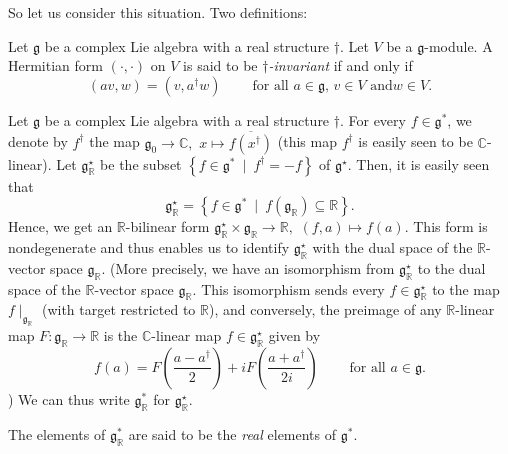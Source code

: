 \documentclass[etingof-lie.tex]{subfiles}
\begin{document}
So let us consider this situation. Two definitions:

\begin{definition}
Let $\mathfrak{g}$ be a complex Lie algebra with a real structure $\dag$. Let
$V$ be a $\mathfrak{g}$-module. A Hermitian form $\left(  \cdot,\cdot\right)
$ on $V$ is said to be $\dag$\textit{-invariant} if and only if%
\[
\left(  av,w\right)  =\left(  v,a^{\dag}w\right)
\ \ \ \ \ \ \ \ \ \ \text{for all }a\in\mathfrak{g}\text{, }v\in V\text{ and
}w\in V.
\]

\end{definition}

\begin{definition}
\label{def.gRstar}Let $\mathfrak{g}$ be a complex Lie algebra with a real
structure $\dag$. For every $f\in\mathfrak{g}^{\ast}$, we denote by $f^{\dag}$
the map $\mathfrak{g}_{0}\rightarrow\mathbb{C},$ $x\mapsto\overline{f\left(
x^{\dag}\right)  }$ (this map $f^{\dag}$ is easily seen to be $\mathbb{C}%
$-linear). Let $\mathfrak{g}_{\mathbb{R}}^{\star}$ be the subset $\left\{
f\in\mathfrak{g}^{\ast}\ \mid\ f^{\dag}=-f\right\}  $ of $\mathfrak{g}^{\star
}$. Then, it is easily seen that%
\[
\mathfrak{g}_{\mathbb{R}}^{\star}=\left\{  f\in\mathfrak{g}^{\ast}%
\ \mid\ f\left(  \mathfrak{g}_{\mathbb{R}}\right)  \subseteq\mathbb{R}%
\right\}  .
\]
Hence, we get an $\mathbb{R}$-bilinear form $\mathfrak{g}_{\mathbb{R}}^{\star
}\times\mathfrak{g}_{\mathbb{R}}\rightarrow\mathbb{R},$ $\left(  f,a\right)
\mapsto f\left(  a\right)  $. This form is nondegenerate and thus enables us
to identify $\mathfrak{g}_{\mathbb{R}}^{\star}$ with the dual space of the
$\mathbb{R}$-vector space $\mathfrak{g}_{\mathbb{R}}$. (More precisely, we
have an isomorphism from $\mathfrak{g}_{\mathbb{R}}^{\star}$ to the dual space
of the $\mathbb{R}$-vector space $\mathfrak{g}_{\mathbb{R}}$. This isomorphism
sends every $f\in\mathfrak{g}_{\mathbb{R}}^{\star}$ to the map $f\mid
_{\mathfrak{g}_{\mathbb{R}}}$ (with target restricted to $\mathbb{R}$), and
conversely, the preimage of any $\mathbb{R}$-linear map $F:\mathfrak{g}%
_{\mathbb{R}}\rightarrow\mathbb{R}$ is the $\mathbb{C}$-linear map
$f\in\mathfrak{g}_{\mathbb{R}}^{\star}$ given by%
\[
f\left(  a\right)  =F\left(  \dfrac{a-a^{\dag}}{2}\right)  +iF\left(
\dfrac{a+a^{\dag}}{2i}\right)  \ \ \ \ \ \ \ \ \ \ \text{for all }%
a\in\mathfrak{g}.
\]
) We can thus write $\mathfrak{g}_{\mathbb{R}}^{\ast}$ for $\mathfrak{g}%
_{\mathbb{R}}^{\star}$.

The elements of $\mathfrak{g}_{\mathbb{R}}^{\ast}$ are said to be the
\textit{real} elements of $\mathfrak{g}^{\ast}$.
\end{definition}
\end{document}
